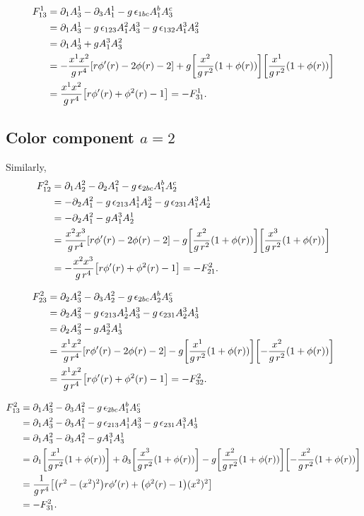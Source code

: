 \documentclass[12pt, a4paper]{article}
\begin{document}
\[
\begin{aligned}
F_{13}^1
&=
\partial_1 A_3^1 - \partial_3 A_1^1 - g\,\epsilon_{1bc} A_1^b A_3^c \\
&=
\partial_1 A_3^1
- g\,\epsilon_{123} A_1^2 A_3^3
- g\,\epsilon_{132} A_1^3 A_3^2 \\
&=
\partial_1 A_3^1 + g A_1^3 A_3^2 \\
&=
-\frac{x^1 x^2}{g\,r^4}\qty[r\phi'(r)-2\phi(r)-2]
+ g\qty[\frac{x^2}{g\,r^2}\qty(1+\phi(r))]\qty[\frac{x^1}{g\,r^2}\qty(1+\phi(r))] \\
&=
\frac{x^1 x^2}{g\,r^4}\qty[r\phi'(r)+\phi^2(r)-1]
= -F_{31}^1.
\end{aligned}
\]

\subsection*{Color component $a=2$}

Similarly,
\[
\begin{aligned}
F_{12}^2
&=
\partial_1 A_2^2 - \partial_2 A_1^2 - g\,\epsilon_{2bc} A_1^b A_2^c \\
&=
-\partial_2 A_1^2 - g\,\epsilon_{213} A_1^1 A_2^3 - g\,\epsilon_{231} A_1^3 A_2^1 \\
&=
-\partial_2 A_1^2 - g A_1^3 A_2^1 \\
&=
\frac{x^2 x^3}{g\,r^4}\qty[r\phi'(r)-2\phi(r)-2]
- g\qty[\frac{x^2}{g\,r^2}\qty(1+\phi(r))]\qty[\frac{x^3}{g\,r^2}\qty(1+\phi(r))] \\
&=
-\frac{x^2 x^3}{g\,r^4}\qty[r\phi'(r)+\phi^2(r)-1]
= -F_{21}^2.
\end{aligned}
\]

\[
\begin{aligned}
F_{23}^2
&=
\partial_2 A_3^2 - \partial_3 A_2^2 - g\,\epsilon_{2bc} A_2^b A_3^c \\
&=
\partial_2 A_3^2 - g\,\epsilon_{213} A_2^1 A_3^3 - g\,\epsilon_{231} A_2^3 A_3^1 \\
&=
\partial_2 A_3^2 - g A_2^3 A_3^1 \\
&=
\frac{x^1 x^2}{g\,r^4}\qty[r\phi'(r)-2\phi(r)-2]
- g\qty[\frac{x^1}{g\,r^2}\qty(1+\phi(r))]\qty[-\frac{x^2}{g\,r^2}\qty(1+\phi(r))] \\
&=
\frac{x^1 x^2}{g\,r^4}\qty[r\phi'(r)+\phi^2(r)-1]
= -F_{32}^2.
\end{aligned}
\]

\[
\begin{aligned}
F_{13}^2
&=
\partial_1 A_3^2 - \partial_3 A_1^2 - g\,\epsilon_{2bc} A_1^b A_3^c \\
&=
\partial_1 A_3^2 - \partial_3 A_1^2
- g\,\epsilon_{213} A_1^1 A_3^3
- g\,\epsilon_{231} A_1^3 A_3^1 \\
&=
\partial_1 A_3^2 - \partial_3 A_1^2 - g A_1^3 A_3^1 \\
&=
\partial_1\qty[\frac{x^1}{g\,r^2}\qty(1+\phi(r))]
+ \partial_3\qty[\frac{x^3}{g\,r^2}\qty(1+\phi(r))]
- g\qty[\frac{x^2}{g\,r^2}\qty(1+\phi(r))]\qty[-\frac{x^2}{g\,r^2}\qty(1+\phi(r))] \\
&=
\frac{1}{g\,r^4}
\qty[
\qty(r^2-(x^2)^2) r\phi'(r)
+ \qty(\phi^2(r)-1)(x^2)^2
] \\
&=
-F_{31}^2.
\end{aligned}
\]
\end{document}
